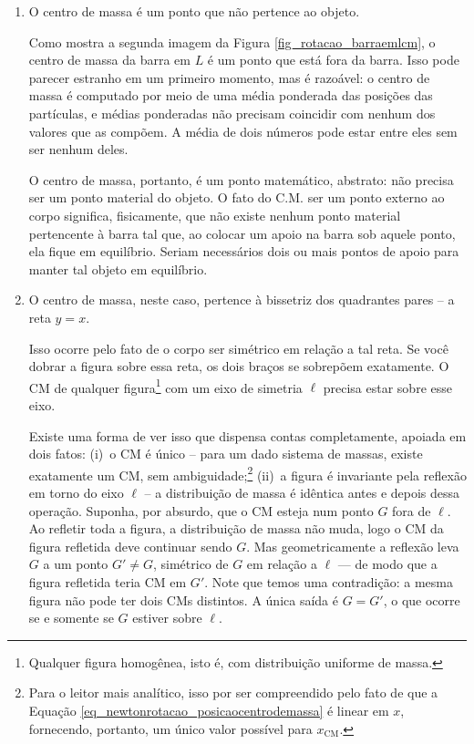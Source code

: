 \begin{enumerate}
    \item O centro de massa é um ponto que não pertence ao objeto. 

    Como mostra a segunda imagem da Figura \ref{fig_rotacao_barraemlcm}, o centro de massa da barra em $L$ é um ponto que está fora da barra. Isso pode parecer estranho em um primeiro momento, mas é razoável: o centro de massa é computado por meio de uma média ponderada das posições das partículas, e médias ponderadas não precisam coincidir com nenhum dos valores que as compõem. A média de dois números pode estar entre eles sem ser nenhum deles. 

    O centro de massa, portanto, é um ponto matemático, abstrato: não precisa ser um ponto material do objeto. O fato do C.M. ser um ponto externo ao corpo significa, fisicamente, que não existe nenhum ponto material pertencente à barra tal que, ao colocar um apoio na barra sob aquele ponto, ela fique em equilíbrio. Seriam necessários dois ou mais pontos de apoio para manter tal objeto em equilíbrio.


   \item O centro de massa, neste caso, pertence à bissetriz dos quadrantes pares -- a reta $y=x$.

   Isso ocorre pelo fato de o corpo ser simétrico em relação a tal reta. Se você dobrar a figura sobre essa reta, os dois braços se sobrepõem exatamente. O CM de qualquer figura\footnote{Qualquer figura homogênea, isto é, com distribuição uniforme de massa.} com um eixo de simetria $\ell$ precisa estar sobre esse eixo.
   
   Existe uma forma de ver isso que dispensa contas completamente, apoiada em dois fatos: (i)~o CM é único -- para um dado sistema de massas, existe exatamente um CM, sem ambiguidade;\footnote{Para o leitor mais analítico, isso por ser compreendido pelo fato de que a Equação \eqref{eq_newtonrotacao_posicaocentrodemassa} é linear em $x$, fornecendo, portanto, um único valor possível para $x_\text{CM}.$} (ii)~a figura é invariante pela reflexão em torno do eixo $\ell$ -- a distribuição de massa é idêntica antes e depois dessa operação. Suponha, por absurdo, que o CM esteja num ponto $G$ fora de $\ell$. Ao refletir toda a figura, a distribuição de massa não muda, logo o CM da figura refletida deve continuar sendo $G$. Mas geometricamente a reflexão leva $G$ a um ponto $G' \neq G$, simétrico de $G$ em relação a $\ell$ — de modo que a figura refletida teria CM em $G'$. Note que temos uma contradição: a mesma figura não pode ter dois CMs distintos. A única saída é $G = G'$, o que ocorre se e somente se $G$ estiver sobre $\ell$.


    
\end{enumerate}

